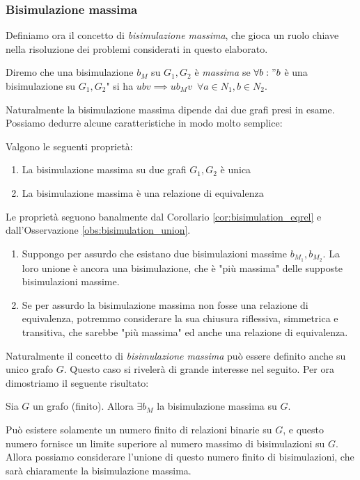 \subsubsection{Bisimulazione massima}
\label{sec:bisi_max}
Definiamo ora il concetto di \textit{bisimulazione massima}, che gioca un ruolo chiave nella risoluzione dei problemi considerati in questo elaborato.
\begin{definition}
    Diremo che una bisimulazione $b_M$ su $G_1, G_2$ è \textit{massima} se $\forall b : "b$ è una bisimulazione su $G_1, G_2$" si ha $u b v \implies u b_M v \,\,\,\forall a \in N_1, b \in N_2$.
\end{definition}
Naturalmente la bisimulazione massima dipende dai due grafi presi in esame. Possiamo dedurre alcune caratteristiche in modo molto semplice:
\begin{proposition}
    Valgono le seguenti proprietà:
    \begin{enumerate}
        \item La bisimulazione massima su due grafi $G_1,G_2$ è unica
        \item La bisimulazione massima è una relazione di equivalenza
    \end{enumerate}
\end{proposition}
\begin{proof2}
    Le proprietà seguono banalmente dal Corollario \ref*{cor:bisimulation_eqrel} e dall'Osservazione \ref*{obs:bisimulation_union}.
    \begin{enumerate}
        \item Suppongo per assurdo che esistano due bisimulazioni massime $b_{M_1}, b_{M_2}$. La loro unione è ancora una bisimulazione, che è "più massima" delle supposte bisimulazioni massime.
        \item Se per assurdo la bisimulazione massima non fosse una relazione di equivalenza, potremmo considerare la sua chiusura riflessiva, simmetrica e transitiva, che sarebbe "più massima" ed anche una relazione di equivalenza.
    \end{enumerate}
\end{proof2}
Naturalmente il concetto di \textit{bisimulazione massima} può essere definito anche su unico grafo $G$. Questo caso si rivelerà di grande interesse nel seguito. Per
ora dimostriamo il seguente risultato:
\begin{theorem}
    Sia $G$ un grafo (finito). Allora $\exists b_M$ la bisimulazione massima su $G$.
\end{theorem}
\begin{proof2}
    Può esistere solamente un numero finito di relazioni binarie su $G$, e questo numero fornisce un limite superiore al numero massimo di bisimulazioni su $G$.
    Allora possiamo considerare l'unione di questo numero finito di bisimulazioni, che sarà chiaramente la bisimulazione massima.
\end{proof2}

